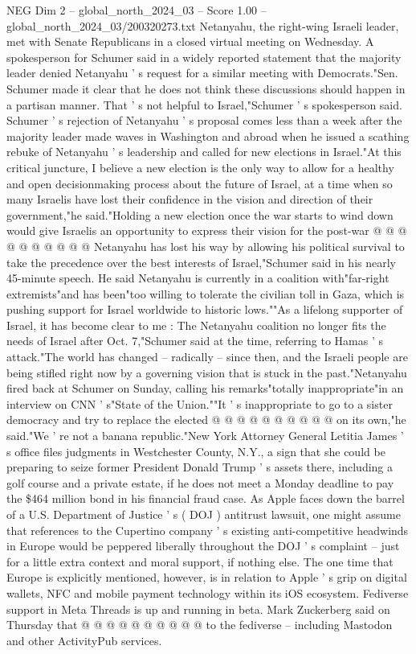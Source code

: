 \begin{textsample}{NEG Dim 2 – global\_north\_2024\_03 – Score 1.00 – global\_north\_2024\_03/200320273.txt}  \label{ex:f2_neg_345}
Netanyahu, the right-wing Israeli leader, met with Senate Republicans in a closed virtual meeting on Wednesday.
A spokesperson for Schumer said in a widely reported statement that the majority leader denied Netanyahu ' s request for a similar meeting with Democrats."Sen.
Schumer made it clear that he does not think these discussions should happen in a partisan manner.
That ' s not helpful to Israel,"Schumer ' s spokesperson said.
Schumer ' s rejection of Netanyahu ' s proposal comes less than a week after the majority leader made waves in Washington and abroad when he issued a scathing rebuke of Netanyahu ' s leadership and called for new elections in Israel."At this critical juncture, I believe a new election is the only way to allow for a healthy and open decisionmaking process about the future of Israel, at a time when so many Israelis have lost their confidence in the vision and direction of their government,"he said."Holding a new election once the war starts to wind down would give Israelis an opportunity to express their vision for the post-war @ @ @ @ @ @ @ @ @ @ Netanyahu has lost his way by allowing his political survival to take the precedence over the best interests of Israel,"Schumer said in his nearly 45-minute speech.
He said Netanyahu is currently in a coalition with"far-right extremists"and has been"too willing to tolerate the civilian toll in Gaza, which is pushing support for Israel worldwide to historic lows.""As a lifelong supporter of Israel, it has become clear to me : The Netanyahu coalition no longer fits the needs of Israel after Oct. 7,"Schumer said at the time, referring to Hamas ' s attack."The world has changed -- radically -- since then, and the Israeli people are being stifled right now by a governing vision that is stuck in the past."Netanyahu fired back at Schumer on Sunday, calling his remarks"totally inappropriate"in an interview on CNN ' s"State of the Union.""It ' s inappropriate to go to a sister democracy and try to replace the elected @ @ @ @ @ @ @ @ @ @ on its own,"he said."We ' re not a banana republic."New York Attorney General Letitia James ' s office files judgments in Westchester County, N.Y., a sign that she could be preparing to seize former President Donald Trump ' s assets there, including a golf course and a private estate, if he does not meet a Monday deadline to pay the \$464 million bond in his financial fraud case.
As Apple faces down the barrel of a U.S.
Department of Justice ' s ( DOJ ) antitrust lawsuit, one might assume that references to the Cupertino company ' s existing anti-competitive headwinds in Europe would be peppered liberally throughout the DOJ ' s complaint -- just for a little extra context and moral support, if nothing else.
The one time that Europe is explicitly mentioned, however, is in relation to Apple ' s grip on digital wallets, NFC and mobile payment technology within its iOS ecosystem.
Fediverse support in Meta Threads is up and running in beta.
Mark Zuckerberg said on Thursday that @ @ @ @ @ @ @ @ @ @ to the fediverse -- including Mastodon and other ActivityPub services.

\end{textsample}

